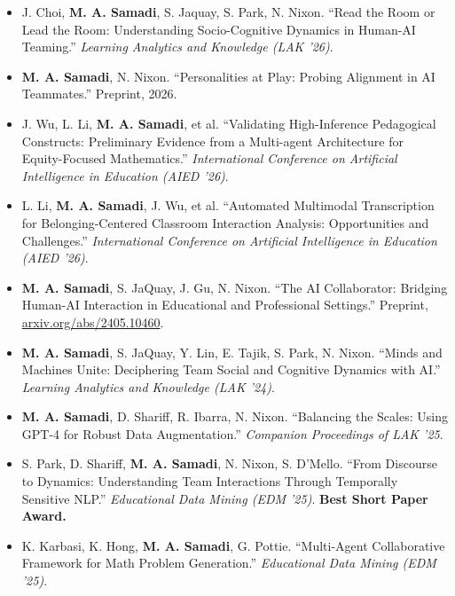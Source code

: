 \documentclass[10pt,letterpaper]{article}
\begin{document}
\begin{itemize}
  \item J. Choi, \textbf{M. A. Samadi}, S. Jaquay, S. Park, N. Nixon. ``Read the Room or Lead the Room: Understanding Socio-Cognitive Dynamics in Human-AI Teaming.'' \textit{Learning Analytics and Knowledge (LAK '26)}.
  \item \textbf{M. A. Samadi}, N. Nixon. ``Personalities at Play: Probing Alignment in AI Teammates.'' Preprint, 2026.
  \item J. Wu, L. Li, \textbf{M. A. Samadi}, et al. ``Validating High-Inference Pedagogical Constructs: Preliminary Evidence from a Multi-agent Architecture for Equity-Focused Mathematics.'' \textit{International Conference on Artificial Intelligence in Education (AIED '26)}.
  \item L. Li, \textbf{M. A. Samadi}, J. Wu, et al. ``Automated Multimodal Transcription for Belonging-Centered Classroom Interaction Analysis: Opportunities and Challenges.'' \textit{International Conference on Artificial Intelligence in Education (AIED '26)}.
  \item \textbf{M. A. Samadi}, S. JaQuay, J. Gu, N. Nixon. ``The AI Collaborator: Bridging Human-AI Interaction in Educational and Professional Settings.'' Preprint, \href{https://arxiv.org/abs/2405.10460}{arxiv.org/abs/2405.10460}.
  \item \textbf{M. A. Samadi}, S. JaQuay, Y. Lin, E. Tajik, S. Park, N. Nixon. ``Minds and Machines Unite: Deciphering Team Social and Cognitive Dynamics with AI.'' \textit{Learning Analytics and Knowledge (LAK '24)}.
  \item \textbf{M. A. Samadi}, D. Shariff, R. Ibarra, N. Nixon. ``Balancing the Scales: Using GPT-4 for Robust Data Augmentation.'' \textit{Companion Proceedings of LAK '25}.
  \item S. Park, D. Shariff, \textbf{M. A. Samadi}, N. Nixon, S. D'Mello. ``From Discourse to Dynamics: Understanding Team Interactions Through Temporally Sensitive NLP.'' \textit{Educational Data Mining (EDM '25)}. \textbf{Best Short Paper Award.}
  \item K. Karbasi, K. Hong, \textbf{M. A. Samadi}, G. Pottie. ``Multi-Agent Collaborative Framework for Math Problem Generation.'' \textit{Educational Data Mining (EDM '25)}.
\end{itemize}
\end{document}
